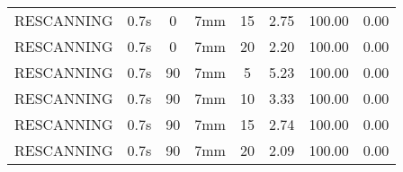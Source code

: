 \begin{table}[H]
\begin{tabular}{|c||c|c|c|c||c|c|c|}
RESCANNING & 0.7s & 0 & 7mm & 15 & 2.75 & 100.00 & 0.00 \\
RESCANNING & 0.7s & 0 & 7mm & 20 & 2.20 & 100.00 & 0.00 \\
RESCANNING & 0.7s & 90 & 7mm & 5 & 5.23 & 100.00 & 0.00 \\
RESCANNING & 0.7s & 90 & 7mm & 10 & 3.33 & 100.00 & 0.00 \\
RESCANNING & 0.7s & 90 & 7mm & 15 & 2.74 & 100.00 & 0.00 \\
RESCANNING & 0.7s & 90 & 7mm & 20 & 2.09 & 100.00 & 0.00 \\
    \hline\hline 
  \end{tabular}
  \label{tab:Pat02_RPV}
\end{table}

\newpage
\thispagestyle{realempty}
\vspace*{-2cm}


